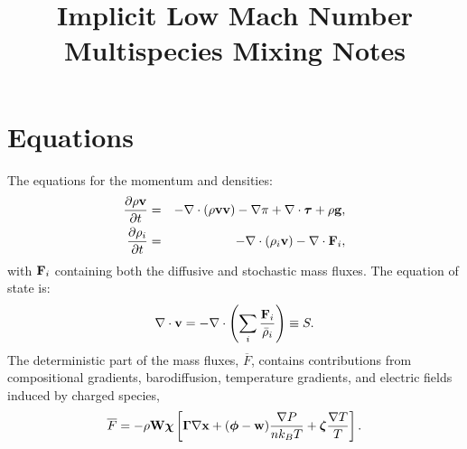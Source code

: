 \documentclass[final]{siamltex}
\def\Fb {{\bf F}}
\def\gb {{\bf g}}
\def\vb {{\bf v}}
\def\wb {{\bf w}}
\def\Wb {{\bf W}}
\def\xb {{\bf x}}
\def\chib   {\boldsymbol{\chi}}
\def\Gammab {\boldsymbol{\Gamma}}
\def\phib   {\boldsymbol{\phi}}
\def\taub   {\boldsymbol{\tau}}
\def\zetab  {\boldsymbol{\zeta}}
\begin{document}
\title{Implicit Low Mach Number Multispecies Mixing Notes}

\maketitle

\section{Equations}
The equations for the momentum and densities:
\begin{eqnarray}
\frac{\partial\rho\vb}{\partial t} &=& - \nabla\cdot(\rho\vb\vb) - \nabla\pi + \nabla\cdot\taub + \rho\gb,\\
\frac{\partial\rho_i}{\partial t} &=& -\nabla\cdot(\rho_i\vb) - \nabla\cdot\Fb_i,
\end{eqnarray}
with $\Fb_i$ containing both the diffusive and stochastic mass fluxes.  The equation of state is:
\begin{equation}
\nabla\cdot\vb = -\nabla\cdot\left(\sum_i\frac{\Fb_i}{\bar\rho_i}\right) \equiv S\label{eq:S}.
\end{equation}
The deterministic part of the mass fluxes, $\overline{F}$, contains contributions from compositional
gradients, barodiffusion, temperature gradients, and electric fields induced by charged species,
\begin{equation}
\overline{F} = -\rho\Wb\chib\left[\Gammab\nabla\xb + (\phib-\wb)\frac{\nabla P}{n k_B T} + \zetab\frac{\nabla T}{T}\right].
\end{equation}

\clearpage
\end{document}
